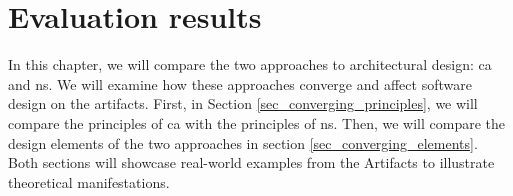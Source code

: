 \chapter{Evaluation results} \label{chap_evaluation}

In this chapter, we will compare the two approaches to architectural design: \gls{ca} and
\gls{ns}. We will examine how these approaches converge and affect software design on the
artifacts. First, in Section \ref{sec_converging_principles}, we will compare the
principles of \gls{ca} with the principles of \gls{ns}. Then, we will compare the design
elements of the two approaches in section \ref{sec_converging_elements}. Both sections
will showcase real-world examples from the Artifacts to illustrate theoretical
manifestations.







